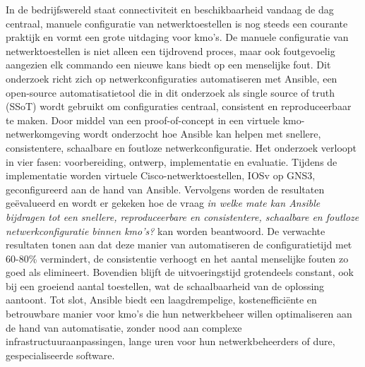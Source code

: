 \documentclass[dutch,dit,thesis]{hogentreport}
\begin{document}
  In de bedrijfswereld staat connectiviteit en beschikbaarheid vandaag de dag centraal, manuele configuratie van netwerktoestellen is nog steeds een courante praktijk en vormt een grote uitdaging voor kmo's. 
  De manuele configuratie van netwerktoestellen is niet alleen een tijdrovend proces, maar ook foutgevoelig aangezien elk commando een nieuwe kans biedt op een menselijke fout. 
  Dit onderzoek richt zich op netwerkconfiguraties automatiseren met Ansible, een open-source automatisatietool die in dit onderzoek als single source of truth (SSoT) wordt gebruikt om configuraties centraal, consistent en reproduceerbaar te maken.
  Door middel van een proof-of-concept in een virtuele kmo-netwerkomgeving wordt onderzocht hoe Ansible kan helpen met snellere, consistentere, schaalbare en foutloze netwerkconfiguratie. 
  Het onderzoek verloopt in vier fasen: voorbereiding, ontwerp, implementatie en evaluatie. 
  Tijdens de implementatie worden virtuele Cisco-netwerktoestellen, IOSv op GNS3, geconfigureerd aan de hand van Ansible.
  Vervolgens worden de resultaten geëvalueerd en wordt er gekeken hoe de vraag \textit{in welke mate kan Ansible bijdragen tot een snellere, reproduceerbare en consistentere, schaalbare en foutloze netwerkconfiguratie binnen kmo's?} kan worden beantwoord.
  De verwachte resultaten tonen aan dat deze manier van automatiseren de configuratietijd met 60-80\% vermindert, de consistentie verhoogt en het aantal menselijke fouten zo goed als elimineert.
  Bovendien blijft de uitvoeringstijd grotendeels constant, ook bij een groeiend aantal toestellen, wat de schaalbaarheid van de oplossing aantoont.
  Tot slot, Ansible biedt een laagdrempelige, kostenefficiënte en betrouwbare manier voor kmo's die hun netwerkbeheer willen optimaliseren aan de hand van automatisatie, zonder nood aan complexe infrastructuuraanpassingen, lange uren voor hun netwerkbeheerders of dure, gespecialiseerde software.


%


\backmatter{}

\setlength\bibitemsep{2pt} %
\printbibliography[heading=bibintoc]
\end{document}
